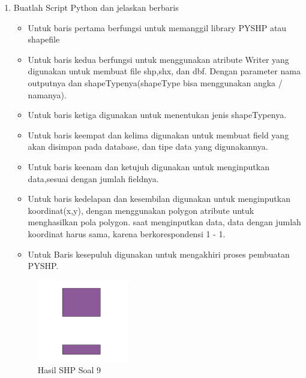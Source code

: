 \begin{enumerate}
	\item Buatlah Script Python dan jelaskan berbaris
	
	\begin{itemize}
		\item Untuk baris pertama berfungsi untuk memanggil library PYSHP atau shapefile
		\item Untuk baris kedua berfungsi untuk menggunakan atribute Writer yang digunakan untuk membuat file shp,shx, dan dbf. \hfill\break Dengan parameter nama outputnya dan shapeTypenya(shapeType bisa menggunakan angka / namanya).
		\item Untuk baris ketiga digunakan untuk menentukan jenis shapeTypenya.
		\item Untuk baris keempat dan kelima digunakan untuk membuat field yang akan disimpan pada database, dan tipe data yang digunakannya.
		\item Untuk baris keenam dan ketujuh digunakan untuk menginputkan data,sesuai dengan jumlah fieldnya.
		\item Untuk baris kedelapan dan kesembilan digunakan untuk menginputkan koordinat(x,y), dengan menggunakan polygon atribute untuk menghasilkan pola polygon. \hfill\break
		saat menginputkan data, data dengan jumlah koordinat harus sama, karena berkorespondensi 1 - 1.
		\item Untuk Baris kesepuluh digunakan untuk mengakhiri proses pembuatan PYSHP.
	\end{itemize}
	\hfill\break
	\begin{figure}[H]
		\includegraphics[width=4cm]{figures/1174004/2/9.png}
		\centering
		\caption{Hasil SHP Soal 9}
	\end{figure}


\end{enumerate}
